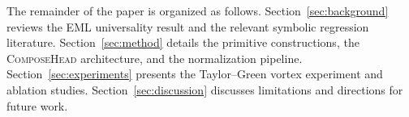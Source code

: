 \noindent The remainder of the paper is organized as follows.
Section~\ref{sec:background} reviews the EML universality result and the
relevant symbolic regression literature.
Section~\ref{sec:method} details the primitive constructions, the
\textsc{ComposeHead} architecture, and the normalization pipeline.
Section~\ref{sec:experiments} presents the Taylor--Green vortex experiment and
ablation studies.
Section~\ref{sec:discussion} discusses limitations and directions for future
work.
